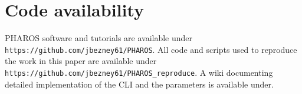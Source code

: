 \documentclass[11pt,a4paper]{article}
\begin{document}
\section{Code availability}\label{sec12}
PHAROS software and tutorials are available under \nolinkurl{https://github.com/jbezney61/PHAROS}. All code and scripts used to reproduce the work in this paper are available under \nolinkurl{https://github.com/jbezney61/PHAROS_reproduce}. A wiki documenting detailed implementation of the CLI and the parameters is available under. 

\FloatBarrier



\end{document}
